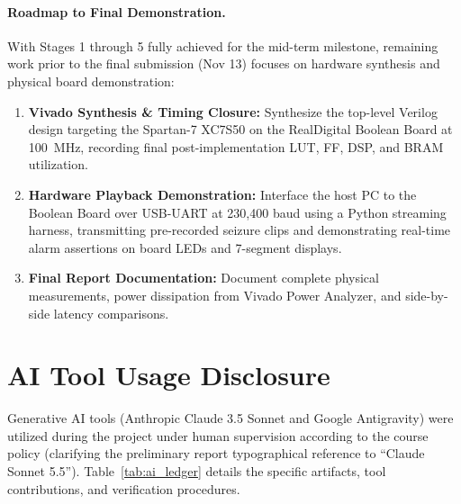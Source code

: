 \documentclass[10pt,twocolumn,letterpaper]{article}
\begin{document}
{\color{blue}
\paragraph{Roadmap to Final Demonstration.}
With Stages 1 through 5 fully achieved for the mid-term milestone, remaining work prior to the final submission (Nov 13) focuses on hardware synthesis and physical board demonstration:
\begin{enumerate}
    \item \textbf{Vivado Synthesis \& Timing Closure:} Synthesize the top-level Verilog design targeting the Spartan-7 XC7S50 on the RealDigital Boolean Board at 100~MHz, recording final post-implementation LUT, FF, DSP, and BRAM utilization.
    \item \textbf{Hardware Playback Demonstration:} Interface the host PC to the Boolean Board over USB-UART at 230,400 baud using a Python streaming harness, transmitting pre-recorded seizure clips and demonstrating real-time alarm assertions on board LEDs and 7-segment displays.
    \item \textbf{Final Report Documentation:} Document complete physical measurements, power dissipation from Vivado Power Analyzer, and side-by-side latency comparisons.
\end{enumerate}
}

\section*{AI Tool Usage Disclosure}

Generative AI tools (Anthropic Claude 3.5 Sonnet and Google Antigravity) were utilized during the project under human supervision according to the course policy (clarifying the preliminary report typographical reference to ``Claude Sonnet 5.5''). Table~\ref{tab:ai_ledger} details the specific artifacts, tool contributions, and verification procedures.
\end{document}

